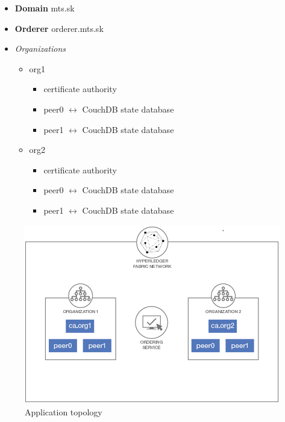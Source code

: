 \newpage
\begin{itemize}
  \item \textbf{Domain} mts.sk
  \item \textbf{Orderer} orderer.mts.sk
  \item \emph{Organizations}
  \begin{itemize}
    \item org1
    \begin{itemize}
      \item certificate authority
      \item{ peer0 $\leftrightarrow$ CouchDB state database}
      \item{ peer1 $\leftrightarrow$ CouchDB state database}
    \end{itemize}
     \item org2
    \begin{itemize}
      \item certificate authority
      \item{ peer0 $\leftrightarrow$ CouchDB state database}
      \item{ peer1 $\leftrightarrow$ CouchDB state database}
    \end{itemize}
  \end{itemize}
\end{itemize}



\begin{figure}[H]
    \begin{center}
        \begin{minipage}{\linewidth}
            \begin{center}
                \includegraphics[width=(\textwidth),keepaspectratio]{img/my_org.png}
                \caption{Application topology}
                \label{obr 1.2.1}
            \end{center}
        \end{minipage}
    \end{center}
\end{figure}
\newpage

